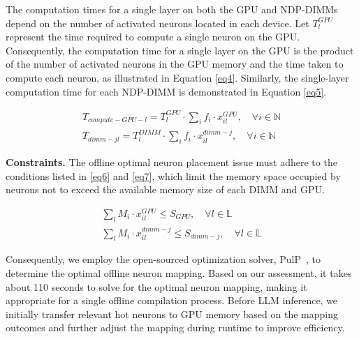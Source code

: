 The computation times for a single layer on both the GPU and NDP-DIMMs depend on the number of activated neurons located in each device. Let $T_{l}^{GPU}$ represent the time required to compute a single neuron on the GPU. Consequently, the computation time for a single layer on the GPU is the product of the number of activated neurons in the GPU memory and the time taken to compute each neuron, as illustrated in Equation \ref{eq4}. Similarly, the single-layer computation time for each NDP-DIMM is demonstrated in Equation \ref{eq5}.%


{
\setlength\abovedisplayskip{0pt}
\setlength\belowdisplayskip{5pt}
\begin{align}
    T_{compute-GPU-l} = T_{l}^{GPU} \cdot \textstyle \sum_{i} f_{i}\cdot x_{il}^{GPU}, \quad \forall i \in \mathbb{N} \label{eq4}\\ 
    T_{dimm-jl} = T_{l}^{DIMM} \cdot \textstyle \sum_{i} f_{i} \cdot x_{il}^{dimm-j}, \quad \forall i \in \mathbb{N} \label{eq5}
\end{align}
}


\textbf{Constraints.}
The offline optimal neuron placement issue must adhere to the conditions listed in \eq \ref{eq6} and \ref{eq7}, which limit the memory space occupied by neurons not to exceed the available memory size of each DIMM and GPU.

{
\setlength\abovedisplayskip{0pt}
\setlength\belowdisplayskip{5pt}
\begin{align}
   \textstyle \sum_{l} M_{i} \cdot x_{il}^{GPU} \le S_{GPU}, \quad \forall l \in \mathbb{L} \label{eq6}\\ 
   \textstyle \sum_{l} M_{i} \cdot x_{il}^{dimm-j} \le S_{dimm-j}, \quad \forall l \in \mathbb{L} \label{eq7}
\end{align}
}

Consequently, we employ the open-sourced optimization solver, PulP~\cite{pulp-solver}, to determine the optimal offline neuron mapping.
Based on our assessment, it takes about 110 seconds to solve for the optimal neuron mapping, making it appropriate for a single offline compilation process. Before LLM inference, we initially transfer relevant hot neurons to GPU memory based on the mapping outcomes and further adjust the mapping during runtime to improve efficiency.


